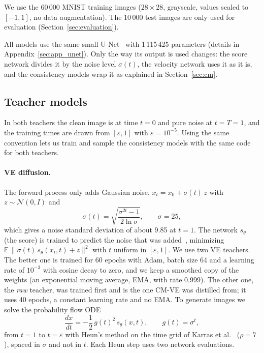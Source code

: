 \documentclass{article}
\begin{document}
We use the 60\,000 MNIST training images ($28\times28$, grayscale, values scaled
to $[-1, 1]$, no data augmentation). The 10\,000 test images are only used for
evaluation (Section~\ref{sec:evaluation}).

All models use the same small U-Net~\cite{ronneberger2015unet} with 1\,115\,425
parameters (details in Appendix~\ref{sec:app_unet}). Only the way its output is
used changes: the score network divides it by the noise level $\sigma(t)$, the
velocity network uses it as it is, and the consistency models wrap it as
explained in Section~\ref{sec:cm}.

\subsection{Teacher models}
\label{sec:teachers}

In both teachers the clean image is at time $t = 0$ and pure noise at
$t = T = 1$, and the training times are drawn from $[\varepsilon, 1]$ with
$\varepsilon = 10^{-5}$. Using the same convention lets us train and sample the
consistency models with the same code for both teachers.

\paragraph{VE diffusion.} The forward process only adds Gaussian noise,
$x_t = x_0 + \sigma(t)\,z$ with $z \sim \mathcal{N}(0, I)$ and
\begin{equation}
  \sigma(t) = \sqrt{\frac{\sigma^{2t} - 1}{2 \ln \sigma}}, \qquad \sigma = 25,
\end{equation}
which gives a noise standard deviation of about 9.85 at $t = 1$. The network
$s_\theta$ (the score) is trained to predict the noise that was
added~\cite{song2021sde}, minimizing
$\mathbb{E}\,\|\sigma(t)\, s_\theta(x_t, t) + z\|^2$ with $t$ uniform in
$[\varepsilon, 1]$. We use two VE teachers. The better one is trained for 60
epochs with Adam, batch size 64 and a learning rate of $10^{-3}$ with cosine
decay to zero, and we keep a smoothed copy of the weights (an exponential
moving average, EMA, with rate 0.999). The other one, the \emph{raw} teacher,
was trained first and is the one CM-VE was distilled from; it uses 40 epochs, a
constant learning rate and no EMA. To generate images we solve the probability
flow ODE
\begin{equation}
  \frac{dx}{dt} = -\frac{1}{2}\, g(t)^2\, s_\theta(x, t), \qquad g(t) = \sigma^t,
\end{equation}
from $t = 1$ to $t = \varepsilon$ with Heun's method on the time grid of Karras
et al.~\cite{karras2022edm} ($\rho = 7$), spaced in $\sigma$ and not in $t$. Each
Heun step uses two network evaluations.
\end{document}

